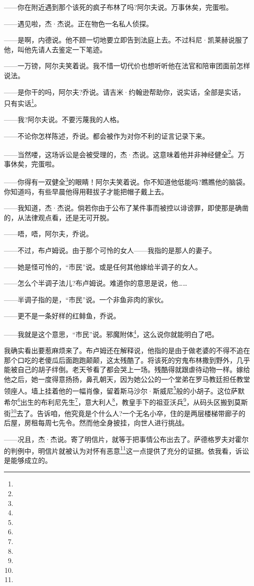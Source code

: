 \par ——你在附近遇到那个该死的疯子布林了吗?阿尔夫说。万事休矣，完蛋啦。
\par ——遇见啦，杰·杰说。正在物色一名私人侦探。
\par ——是啊，内德说。他不顾一切地要立即告到法庭上去。不过科尼·凯莱赫说服了他，叫他先请人去鉴定一下笔迹。
\par ——一万镑，阿尔夫笑着说。我不惜一切代价也想听听他在法官和陪审团面前怎样说法。
\par ——是你干的吗，阿尔夫?乔说。请吉米·约翰逊帮助你，说实话，全部是实话，只有实话\footnote{}。
\par ——我?阿尔夫说。不要污蔑我的人格。
\par ——不论你怎样陈述，乔说。都会被作为对你不利的证言记录下来。
\par ——当然喽，这场诉讼是会被受理的，杰·杰说。这意味着他并非神经健全\footnote{}。万事休矣，完蛋啦。
\par ——你得有一双健全\footnote{}的眼睛！阿尔夫笑着说。你不知道他低能吗?瞧瞧他的脑袋。你知道吗，有些早晨他得用鞋拔子才能把帽子戴上去。
\par ——我知道，杰·杰说。倘若你由于公布了某件事而被控以诽谤罪，即使那是确凿的，从法律观点看，还是无可开脱。
\par ——唔，唔，阿尔夫，乔说。
\par ——不过，布卢姆说。由于那个可怜的女人——我指的是那人的妻子。
\par ——她是怪可怜的，“市民”说。或是任何其他嫁给半调子的女人。
\par ——怎么个半调子法儿?布卢姆说。难道你的意思是说，他……
\par ——半调子指的是，“市民”说。一个非鱼非肉的家伙。
\par ——更不是一条好样的红鲱鱼，乔说。
\par ——我就是这个意思，“市民”说。邪魔附体\footnote{}，这么说你就能明白了吧。
\par 我确实看出要惹麻烦来了。布卢姆还在解释说，他指的是由于做老婆的不得不追在那个口吃的老傻瓜后面跑跑颠颠，这太残酷了。将该死的穷鬼布林撒到野外，几乎能被自己的胡子绊倒。老天爷看了都会哭上一场。残酷得就跟虐待动物一样。嫁给他之后，她一度得意扬扬，鼻孔朝天，因为她公公的一个堂弟在罗马教廷担任教堂领座人。墙上挂着他的一幅肖像，留着斯马沙尔·斯威尼\footnote{}般的小胡子。这位萨默希尔\footnote{}出生的布利尼先生\footnote{}，意大利人\footnote{}，教皇手下的祖亚沃兵\footnote{}，从码头区搬到莫斯街\footnote{}去了。告诉咱，他究竟是个什么人?一个无名小卒，住的是两层楼梯带廊子的后屋，房租每周七先令。然而他全身披挂，向世人进行挑战。
\par ——况且，杰·杰说。寄了明信片，就等于把事情公布出去了。萨德格罗夫对霍尔的判例中，明信片就被认为对怀有恶意\footnote{}这一点提供了充分的证据。依我看，诉讼是能够成立的。
